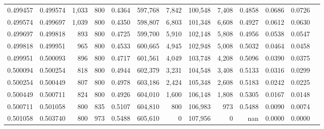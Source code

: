 \begin{tabular}{rrrrrrrrrrrrr}
0.499457 & 0.499574 &  1,033 & 800 &                                     0.4364 & 597,768 &   7,842 & 100,548 &   7,408 & 0.4858 & 0.0686 & 0.0726 \\
0.499574 & 0.499697 &  1,039 & 800 &                                     0.4350 & 598,807 &   6,803 & 101,348 &   6,608 & 0.4927 & 0.0612 & 0.0630 \\
0.499697 & 0.499818 &    893 & 800 &                                     0.4725 & 599,700 &   5,910 & 102,148 &   5,808 & 0.4956 & 0.0538 & 0.0547 \\
0.499818 & 0.499951 &    965 & 800 &                                     0.4533 & 600,665 &   4,945 & 102,948 &   5,008 & 0.5032 & 0.0464 & 0.0458 \\
0.499951 & 0.500093 &    896 & 800 &                                     0.4717 & 601,561 &   4,049 & 103,748 &   4,208 & 0.5096 & 0.0390 & 0.0375 \\
0.500094 & 0.500254 &    818 & 800 &                                     0.4944 & 602,379 &   3,231 & 104,548 &   3,408 & 0.5133 & 0.0316 & 0.0299 \\
0.500254 & 0.500449 &    807 & 800 &                                     0.4978 & 603,186 &   2,424 & 105,348 &   2,608 & 0.5183 & 0.0242 & 0.0225 \\
0.500449 & 0.500711 &    824 & 800 &                                     0.4926 & 604,010 &   1,600 & 106,148 &   1,808 & 0.5305 & 0.0167 & 0.0148 \\
0.500711 & 0.501058 &    800 & 835 &                                     0.5107 & 604,810 &     800 & 106,983 &     973 & 0.5488 & 0.0090 & 0.0074 \\
0.501058 & 0.503740 &    800 & 973 &                                     0.5488 & 605,610 &       0 & 107,956 &       0 &    nan & 0.0000 & 0.0000 \\
\bottomrule
\end{tabular}
